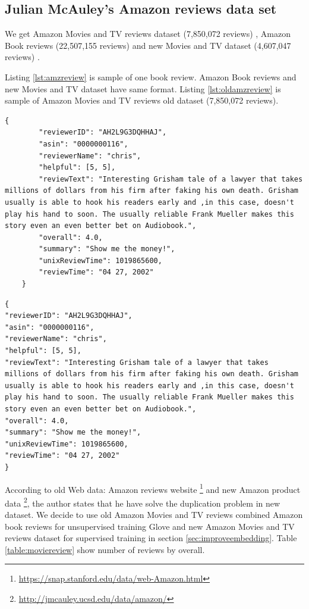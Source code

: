\subsection{Julian McAuley's Amazon reviews data set}
We get Amazon Movies and TV reviews dataset (7,850,072 reviews) \cite{mcauley2013hidden}, Amazon Book reviews (22,507,155 reviews) and new Movies and TV dataset (4,607,047 reviews) \cite{he2016ups}. 

Listing \ref{lst:amzreview} is sample of one book review. Amazon Book reviews and new Movies and TV dataset  have same format. Listing \ref{lst:oldamzreview} is sample of Amazon Movies and TV reviews old dataset (7,850,072 reviews). 

\begin{lstlisting}[caption={Amazon reviews sample},label={lst:amzreview}]
	{
		"reviewerID": "AH2L9G3DQHHAJ",
		"asin": "0000000116",
		"reviewerName": "chris",
		"helpful": [5, 5],
		"reviewText": "Interesting Grisham tale of a lawyer that takes millions of dollars from his firm after faking his own death. Grisham usually is able to hook his readers early and ,in this case, doesn't play his hand to soon. The usually reliable Frank Mueller makes this story even an even better bet on Audiobook.",
		"overall": 4.0,
		"summary": "Show me the money!",
		"unixReviewTime": 1019865600,
		"reviewTime": "04 27, 2002"
	}
\end{lstlisting}

\begin{lstlisting}[caption={Old Amazon reviews sample},label={lst:oldamzreview}]
{
"reviewerID": "AH2L9G3DQHHAJ",
"asin": "0000000116",
"reviewerName": "chris",
"helpful": [5, 5],
"reviewText": "Interesting Grisham tale of a lawyer that takes millions of dollars from his firm after faking his own death. Grisham usually is able to hook his readers early and ,in this case, doesn't play his hand to soon. The usually reliable Frank Mueller makes this story even an even better bet on Audiobook.",
"overall": 4.0,
"summary": "Show me the money!",
"unixReviewTime": 1019865600,
"reviewTime": "04 27, 2002"
}
\end{lstlisting}

According to old Web data: Amazon reviews website  \footnote{\url{https://snap.stanford.edu/data/web-Amazon.html}} and new Amazon product data \footnote{\url{http://jmcauley.ucsd.edu/data/amazon/}}, the author states that he have solve the duplication problem in new dataset. We decide to use old Amazon Movies and TV reviews combined Amazon book reviews for unsupervised training Glove and new Amazon Movies and TV reviews dataset for supervised training in section \ref{sec:improveembedding}. Table \ref{table:moviereview} show number of reviews by overall.

